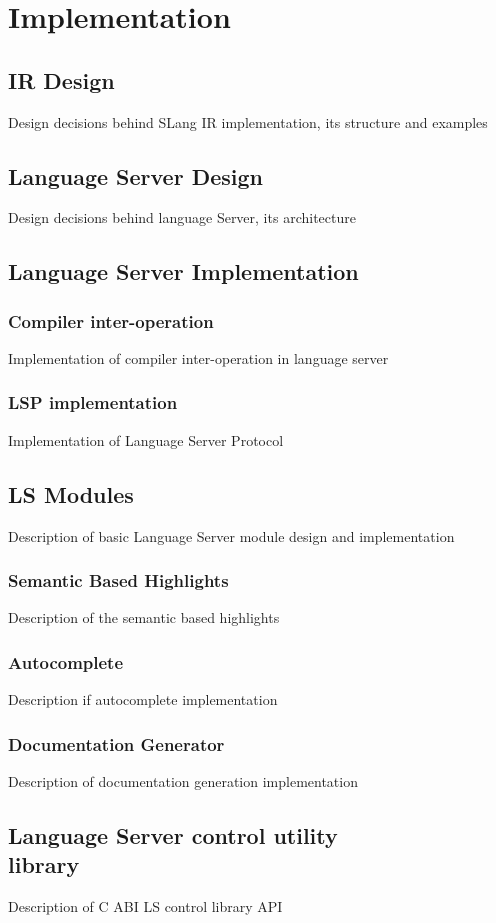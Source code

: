 \chapter{Implementation}
\label{chap:impl}

\section{IR Design}
\label{sec:impl:ir_design}
Design decisions behind SLang IR implementation, its structure and examples

\section{Language Server Design}
\label{sec:impl:ls_design}
Design decisions behind language Server, its architecture

\section{Language Server Implementation}
\label{sec:impl:ls_impl}

\subsection{Compiler inter-operation}
\label{sec:impl:ls_compiler_interop}
Implementation of compiler inter-operation in language server

\subsection{LSP implementation}
Implementation of Language Server Protocol

\section{LS Modules}
\label{sec:impl:ls_mod}
Description of basic Language Server module design and implementation

\subsection{Semantic Based Highlights}
\label{sec:impl:ls_mod:semhighlight}
Description of the semantic based highlights

\subsection{Autocomplete}
\label{sec:impl:ls_mod:autocomplete}
Description if autocomplete implementation

\subsection{Documentation Generator}
\label{sec:impl:ls_mod:docgen}
Description of documentation generation implementation

\section{Language Server control utility\\ library}
\label{sec:impl:ls_control_api}
Description of C ABI LS control library API

